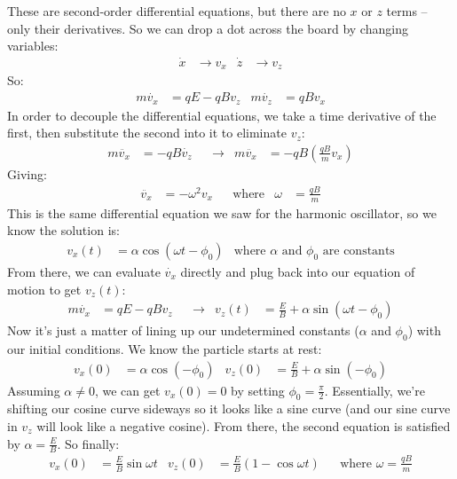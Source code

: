 \documentclass[12pt]{article}
\begin{document}
{These are second-order differential equations, but there are no $x$ or $z$ terms -- only their derivatives. So we can drop a dot across the board by changing variables:
\begin{align*}
    \dot{x} &\rightarrow v_x &
    \dot{z} &\rightarrow v_z
\end{align*}
So:
\begin{align*}
    m \dot{v_x} &= qE - qBv_z &
    m \dot{v_z} &= qBv_x
\end{align*}
In order to decouple the differential equations, we take a time derivative of the first, then substitute the second into it to eliminate $v_z$:
\begin{align*}
    m \ddot{v_x} &= - qB\dot{v_z} &
    &\rightarrow&
    m \ddot{v_x} &= - qB \left( \frac{qB}{m} v_x \right)
\end{align*}
Giving:
\begin{align*}
    \ddot{v_x} &= -\omega^2 v_x &
    &\text{where}&
    \omega &= \frac{qB}{m}
\end{align*}
This is the same differential equation we saw for the harmonic oscillator, so we know the solution is:
\begin{align*}
    v_x(t) &= \alpha \cos \left( \omega t - \phi_0 \right) &
    \text{where $\alpha$ and $\phi_0$ are constants}
\end{align*}
From there, we can evaluate $\dot{v_x}$ directly and plug back into our equation of motion to get $v_z(t)$:
\begin{align*}
    m \dot{v_x} &= qE - qBv_z &
    &\rightarrow&
    v_z (t) &= \tfrac{E}{B} + \alpha \sin \left( \omega t - \phi_0 \right)
\end{align*}
Now it's just a matter of lining up our undetermined constants ($\alpha$ and $\phi_0$) with our initial conditions. We know the particle starts at rest:
\begin{align*}
    v_x(0) &= \alpha \cos \left( - \phi_0 \right) &
    v_z(0) &= \tfrac{E}{B} + \alpha \sin \left( - \phi_0 \right)
\end{align*}
Assuming $\alpha \not= 0$, we can get $v_x(0)=0$ by setting $\phi_0=\tfrac{\pi}{2}$. Essentially, we're shifting our cosine curve sideways so it looks like a sine curve (and our sine curve in $v_z$ will look like a negative cosine). From there, the second equation is satisfied by $\alpha=\tfrac{E}{B}$. So finally:
\begin{align*}
    v_x(0) &= \tfrac{E}{B} \sin \omega t &
    v_z(0) &= \tfrac{E}{B} \left( 1 - \cos \omega t \right) &
    & \text{where $\omega = \tfrac{qB}{m}$}

\end{align*}}
\end{document}
